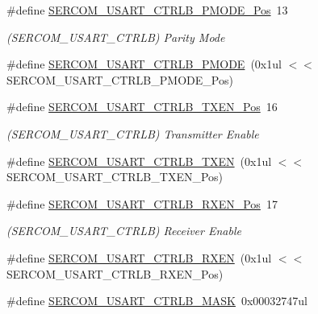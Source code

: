 \begin{DoxyCompactItemize}
\item 
\#define \mbox{\hyperlink{group___s_a_m_d21___s_e_r_c_o_m_gaf2edd68e5c378c90d6b689bb99a50a75}{S\+E\+R\+C\+O\+M\+\_\+\+U\+S\+A\+R\+T\+\_\+\+C\+T\+R\+L\+B\+\_\+\+P\+M\+O\+D\+E\+\_\+\+Pos}}~13
\begin{DoxyCompactList}\small\item\em (S\+E\+R\+C\+O\+M\+\_\+\+U\+S\+A\+R\+T\+\_\+\+C\+T\+R\+LB) Parity Mode \end{DoxyCompactList}\item 
\#define \mbox{\hyperlink{group___s_a_m_d21___s_e_r_c_o_m_ga41386bd20707b1e8edb4e78e356e15bd}{S\+E\+R\+C\+O\+M\+\_\+\+U\+S\+A\+R\+T\+\_\+\+C\+T\+R\+L\+B\+\_\+\+P\+M\+O\+DE}}~(0x1ul $<$$<$ S\+E\+R\+C\+O\+M\+\_\+\+U\+S\+A\+R\+T\+\_\+\+C\+T\+R\+L\+B\+\_\+\+P\+M\+O\+D\+E\+\_\+\+Pos)
\item 
\#define \mbox{\hyperlink{group___s_a_m_d21___s_e_r_c_o_m_gad79231677ec252cfca55bdb525b1676e}{S\+E\+R\+C\+O\+M\+\_\+\+U\+S\+A\+R\+T\+\_\+\+C\+T\+R\+L\+B\+\_\+\+T\+X\+E\+N\+\_\+\+Pos}}~16
\begin{DoxyCompactList}\small\item\em (S\+E\+R\+C\+O\+M\+\_\+\+U\+S\+A\+R\+T\+\_\+\+C\+T\+R\+LB) Transmitter Enable \end{DoxyCompactList}\item 
\#define \mbox{\hyperlink{group___s_a_m_d21___s_e_r_c_o_m_gaa3d0f673d3b42d21ecc3e92d9eea68f6}{S\+E\+R\+C\+O\+M\+\_\+\+U\+S\+A\+R\+T\+\_\+\+C\+T\+R\+L\+B\+\_\+\+T\+X\+EN}}~(0x1ul $<$$<$ S\+E\+R\+C\+O\+M\+\_\+\+U\+S\+A\+R\+T\+\_\+\+C\+T\+R\+L\+B\+\_\+\+T\+X\+E\+N\+\_\+\+Pos)
\item 
\#define \mbox{\hyperlink{group___s_a_m_d21___s_e_r_c_o_m_ga815a8434a10377541566a72f5fab4d25}{S\+E\+R\+C\+O\+M\+\_\+\+U\+S\+A\+R\+T\+\_\+\+C\+T\+R\+L\+B\+\_\+\+R\+X\+E\+N\+\_\+\+Pos}}~17
\begin{DoxyCompactList}\small\item\em (S\+E\+R\+C\+O\+M\+\_\+\+U\+S\+A\+R\+T\+\_\+\+C\+T\+R\+LB) Receiver Enable \end{DoxyCompactList}\item 
\#define \mbox{\hyperlink{group___s_a_m_d21___s_e_r_c_o_m_gab8bb6a17cafc60be185c1b956c2aae65}{S\+E\+R\+C\+O\+M\+\_\+\+U\+S\+A\+R\+T\+\_\+\+C\+T\+R\+L\+B\+\_\+\+R\+X\+EN}}~(0x1ul $<$$<$ S\+E\+R\+C\+O\+M\+\_\+\+U\+S\+A\+R\+T\+\_\+\+C\+T\+R\+L\+B\+\_\+\+R\+X\+E\+N\+\_\+\+Pos)
\item 
\#define \mbox{\hyperlink{group___s_a_m_d21___s_e_r_c_o_m_ga239afcaac25026375f3f8abd0a9aa5e7}{S\+E\+R\+C\+O\+M\+\_\+\+U\+S\+A\+R\+T\+\_\+\+C\+T\+R\+L\+B\+\_\+\+M\+A\+SK}}~0x00032747ul
$$
\end{DoxyCompactItemize}
